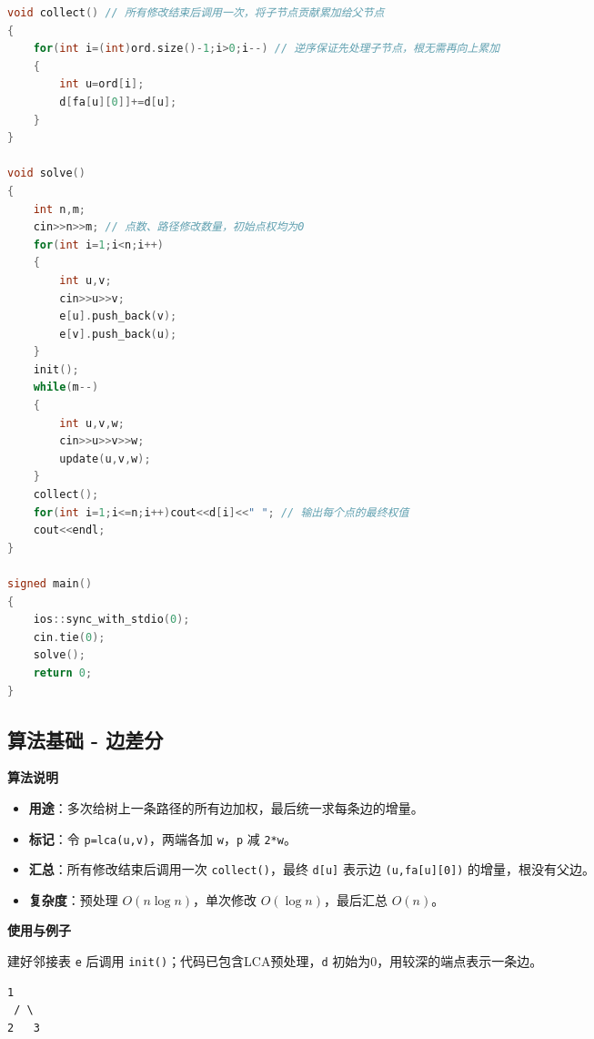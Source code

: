 \documentclass[10pt,landscape,a4paper]{article}
\begin{document}
\begin{multicols*}{3}
\begin{lstlisting}[language=C++]
void collect() // 所有修改结束后调用一次，将子节点贡献累加给父节点
{
    for(int i=(int)ord.size()-1;i>0;i--) // 逆序保证先处理子节点，根无需再向上累加
    {
        int u=ord[i];
        d[fa[u][0]]+=d[u];
    }
}

void solve()
{
    int n,m;
    cin>>n>>m; // 点数、路径修改数量，初始点权均为0
    for(int i=1;i<n;i++)
    {
        int u,v;
        cin>>u>>v;
        e[u].push_back(v);
        e[v].push_back(u);
    }
    init();
    while(m--)
    {
        int u,v,w;
        cin>>u>>v>>w;
        update(u,v,w);
    }
    collect();
    for(int i=1;i<=n;i++)cout<<d[i]<<" "; // 输出每个点的最终权值
    cout<<endl;
}

signed main()
{
    ios::sync_with_stdio(0);
    cin.tie(0);
    solve();
    return 0;
}
\end{lstlisting}
\subsection*{算法基础 - 边差分}
\par\addvspace{0.7ex}\noindent\textbf{算法说明}\par\nobreak
\begin{itemize}
\item \textbf{用途}：多次给树上一条路径的所有边加权，最后统一求每条边的增量。
\item \textbf{标记}：令 \texttt{p\allowbreak{}=\allowbreak{}l\allowbreak{}c\allowbreak{}a\allowbreak{}(\allowbreak{}u\allowbreak{},\allowbreak{}v\allowbreak{})}，两端各加 \texttt{w}，\texttt{p} 减 \texttt{2\allowbreak{}*\allowbreak{}w}。
\item \textbf{汇总}：所有修改结束后调用一次 \texttt{c\allowbreak{}o\allowbreak{}l\allowbreak{}l\allowbreak{}e\allowbreak{}c\allowbreak{}t\allowbreak{}(\allowbreak{})}，最终 \texttt{d\allowbreak{}[\allowbreak{}u\allowbreak{}]} 表示边 \texttt{(\allowbreak{}u\allowbreak{},\allowbreak{}f\allowbreak{}a\allowbreak{}[\allowbreak{}u\allowbreak{}]\allowbreak{}[\allowbreak{}0\allowbreak{}]\allowbreak{})} 的增量，根没有父边。
\item \textbf{复杂度}：预处理 $O(n\log n)$，单次修改 $O(\log n)$，最后汇总 $O(n)$。
\end{itemize}
\par\addvspace{0.7ex}\noindent\textbf{使用与例子}\par\nobreak
建好邻接表 \texttt{e} 后调用 \texttt{i\allowbreak{}n\allowbreak{}i\allowbreak{}t\allowbreak{}(\allowbreak{})}；代码已包含LCA预处理，\texttt{d} 初始为0，用较深的端点表示一条边。\par
\begin{lstlisting}[language={},numbers=none,basicstyle=\footnotesize\ttfamily]
  1
 / \
2   3
\end{lstlisting}


\end{multicols*}
\end{document}
